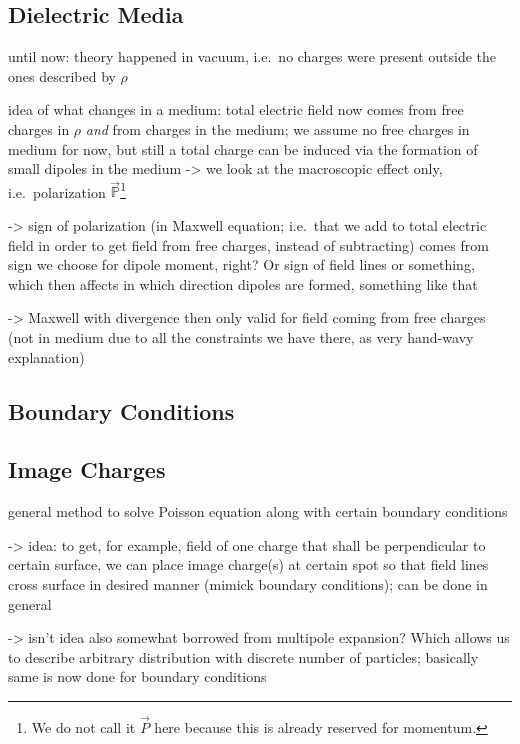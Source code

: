 \documentclass[../class_mech_main.tex]{subfiles}
\begin{document}
        \subsection{Dielectric Media}

until now: theory happened in vacuum, i.e.~no charges were present outside the ones described by $\rho$

idea of what changes in a medium: total electric field now comes from free charges in $\rho$ \emph{and} from charges in the medium; we assume no free charges in medium for now, but still a total charge can be induced via the formation of small dipoles in the medium -> we look at the macroscopic effect only, i.e.~polarization $\vec{\mathbb{P}}$\footnote{We do not call it $\vec{P}$ here because this is already reserved for momentum.}

-> sign of polarization (in Maxwell equation; i.e.~that we add to total electric field in order to get field from free charges, instead of subtracting) comes from sign we choose for dipole moment, right? Or sign of field lines or something, which then affects in which direction dipoles are formed, something like that

-> Maxwell with divergence then only valid for field coming from free charges (not in medium due to all the constraints we have there, as very hand-wavy explanation)



        \subsection{Boundary Conditions}



        \subsection{Image Charges}
general method to solve Poisson equation along with certain boundary conditions

-> idea: to get, for example, field of one charge that shall be perpendicular to certain surface, we can place image charge(s) at certain spot so that field lines cross surface in desired manner (mimick boundary conditions); can be done in general

-> isn't idea also somewhat borrowed from multipole expansion? Which allows us to describe arbitrary distribution with discrete number of particles; basically same is now done for boundary conditions
\end{document}
